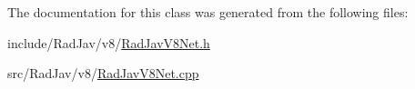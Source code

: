 The documentation for this class was generated from the following files\+:\begin{DoxyCompactItemize}
\item 
include/\+Rad\+Jav/v8/\mbox{\hyperlink{_rad_jav_v8_net_8h}{Rad\+Jav\+V8\+Net.\+h}}\item 
src/\+Rad\+Jav/v8/\mbox{\hyperlink{_rad_jav_v8_net_8cpp}{Rad\+Jav\+V8\+Net.\+cpp}}\end{DoxyCompactItemize}
